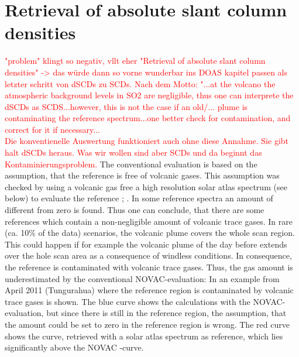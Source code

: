 \section{Retrieval of absolute slant column densities\label{Chap:Cont}}
\textcolor{red}{"problem" klingt so negativ, vllt eher "Retrieval of absolute slant column densities" -> das würde dann so vorne wunderbar ins DOAS kapitel passen als letzter schritt von dSCDs zu SCDs. Nach dem Motto: "...at the volcano the atmospheric background levels in SO2 are negligible, thus one can interprete the dSCDs as SCDS...however, this is not the case if an old/... plume is contaminating the reference spectrum...one better check for contamination, and correct for it if necessary...}\\
\textcolor{red}{Die konventienelle Auswertung funktioniert auch ohne diese Annahme. Sie gibt halt dSCDs heraus. Was wir wollen sind aber SCDs und da beginnt das Kontaminierungsproblem.}
The conventional evaluation is based on the assumption, that the reference is free of volcanic gases. This assumption was checked by using a volcanic gas free a high resolution solar atlas spectrum (see below) to evaluate the reference \cite{lubcke2014optical}; \cite{salerno2009novel}. In some reference spectra an amount of   different from zero is found. Thus one can conclude, that there are some references which contain a non-negligible amount of volcanic trace gases.
In rare (ca. 10\% of the data) scenarios, the
volcanic plume covers the whole scan region.
This could happen if for example the volcanic plume of the day before extends over the hole scan area as a consequence of windless conditions.
In consequence, the reference	is contaminated with volcanic trace gases. Thus, the gas amount is underestimated by the conventional NOVAC-evaluation: In  an example from April 2011 (Tungurahua) where the reference region is contaminated by volcanic trace gases is shown. The blue  curve shows the calculations with the NOVAC-evaluation, but since there is still  in the reference region, the assumption, that the  amount could be set to zero in the reference region is wrong. The red curve shows the  curve, retrieved with a solar atlas spectrum as reference, which lies significantly above the NOVAC -curve.\\
\\	
%
